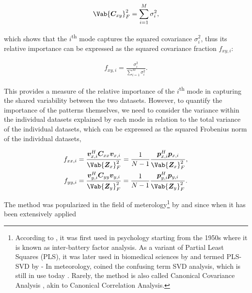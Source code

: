 \begin{align}
    \Vab{\bm{C}_{xy}}_F^2 = \sum_{i=1}^{M} \sigma_i^2, 
\end{align}    

which shows that the $i$\textsuperscript{th} mode captures the squared covariance $\sigma_i^2$, thus its relative importance can be expressed as the squared covariance fraction $f_{xy, i}$:

\begin{align}
    f_{xy, i} = \frac{\sigma_i^2}{\sum_{i=1}^{M} \sigma_i^2}.
\end{align}

This provides a measure of the relative importance of the $i$\textsuperscript{th} mode in capturing the shared variability between the two datasets. However, to quantify the importance of the patterns themselves, we need to consider the variance within the individual datasets explained by each mode in relation to the total variance of the individual datasets, which can be expressed as the squared Frobenius norm of the individual datasets,

\begin{align}
    f_{xx, i} &= \frac{\bm{v}_{x,i}^H\bm{C}_{xx}\bm{v}_{x,i}}{\Vab{\bm{Z}_x}_F^2} = \frac{1}{N-1} \frac{\bm{p}_{x,i}^H\bm{p}_{x,i}}{\Vab{\bm{Z}_x}_F^2},\\
    f_{yy, i} &= \frac{\bm{v}_{y,i}^H\bm{C}_{yy}\bm{v}_{y,i}}{\Vab{\bm{Z}_y}_F^2} = \frac{1}{N-1} \frac{\bm{p}_{y,i}^H\bm{p}_{y,i}}{\Vab{\bm{Z}_y}_F^2}.
\end{align}

The method was popularized in the field of meterology\footnote{According to \citet[][p. 225]{jolliffe_principal_2002}, it was first used in psychology starting from the 1950s where it is known as inter-battery factor analysis. As a variant of Partial Least Squares (PLS), it was later used in biomedical sciences by \citet{sampson_neurobehavioral_1989} and termed PLS-SVD by \citet{wegelin_survey_2000}- In meteorology, \citet{bretherton_intercomparison_1992} coined the confusing term SVD analysis, which is still in use today \cite[e.g.][]{mori_reconciled_2019}. Rarely, the method is also called Canonical Covariance Analysis \cite[e.g.][]{cherry_singular_1996,hannachi_patterns_2021}, akin to Canonical Correlation Analysis.} by \citet{bretherton_intercomparison_1992} and \citet{wallace_singular_1992} since when it has been extensively applied \cite[e.g.][]{wallace_singular_1992,tsai_maximum_2009,li_north_2016,barreto_maximum_2017,mori_reconciled_2019,rathore_improving_2021}



